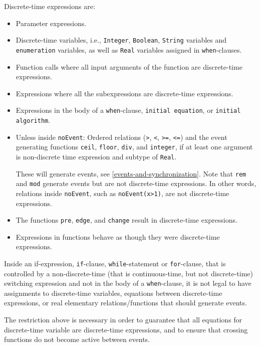 Discrete-time expressions are:
\begin{itemize}
\item
  Parameter expressions.
\item
  Discrete-time variables, i.e., \lstinline!Integer!, \lstinline!Boolean!, \lstinline!String! variables and \lstinline!enumeration! variables, as well as \lstinline!Real! variables assigned in \lstinline!when!-clauses.
\item
  Function calls where all input arguments of the function are discrete-time expressions.
\item
  Expressions where all the subexpressions are discrete-time expressions.
\item
  Expressions in the body of a \lstinline!when!-clause, \lstinline!initial equation!, or \lstinline!initial algorithm!.
\item
  Unless inside \lstinline!noEvent!: Ordered relations (\lstinline!>!, \lstinline!<!, \lstinline!>=!, \lstinline!<=!) and the event generating functions \lstinline!ceil!, \lstinline!floor!, \lstinline!div!, and \lstinline!integer!, if at least one argument is non-discrete time expression and subtype of \lstinline!Real!.
  \begin{nonnormative}
  These will generate events, see \cref{events-and-synchronization}.  Note that \lstinline!rem! and \lstinline!mod! generate events but are not discrete-time expressions.  In other words, relations inside \lstinline!noEvent!, such as \lstinline!noEvent(x>1)!, are not discrete-time expressions.
  \end{nonnormative}
\item
  The functions \lstinline!pre!, \lstinline!edge!, and \lstinline!change! result in discrete-time expressions.
\item
  Expressions in functions behave as though they were discrete-time expressions.
\end{itemize}

Inside an if-expression, \lstinline!if!-clause, \lstinline!while!-statement or \lstinline!for!-clause, that
is controlled by a non-discrete-time (that is continuous-time, but not
discrete-time) switching expression and not in the body of a
\lstinline!when!-clause, it is not legal to have assignments to discrete-time variables,
equations between discrete-time expressions, or real elementary
relations/functions that should generate events.

\begin{nonnormative}
The restriction above is necessary in order to guarantee that all equations for discrete-time variable are discrete-time expressions, and to ensure that crossing
functions do not become active between events.
\end{nonnormative}

